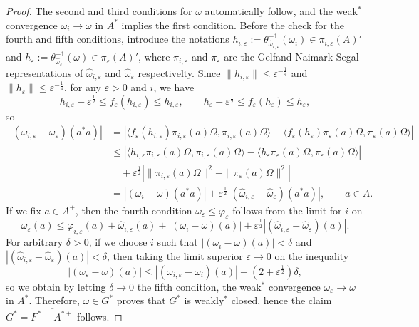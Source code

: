 \documentclass[a4paper]{amsart}
\newcommand{\e}{\varepsilon}
\theoremstyle{plain}
\theoremstyle{definition}
\begin{document}
\begin{proof}
The second and third conditions for $\omega$ automatically follow, and the weak$^*$ convergence $\omega_i\to\omega$ in $A^*$ implies the first condition.
Before the check for the fourth and fifth conditions, introduce the notations $h_{i,\e}:=\theta_{\widehat\omega_{i,\e}}^{-1}(\omega_i)\in\pi_{i,\e}(A)'$ and $h_\e:=\theta_{\widehat\omega_\e}^{-1}(\omega)\in\pi_\e(A)'$, where $\pi_{i,\e}$ and $\pi_\e$ are the Gelfand-Naimark-Segal representations of $\widehat\omega_{i,\e}$ and $\widehat\omega_\e$ respectivelty.
Since $\|h_{i,\e}\|\le\e^{-\frac14}$ and $\|h_\e\|\le\e^{-\frac14}$, for any $\e>0$ and $i$, we have
\[h_{i,\e}-\e^{\frac12}\le f_\e(h_{i,\e})\le h_{i,\e},\qquad h_\e-\e^{\frac12}\le f_\e(h_\e)\le h_\e,\]
so
\begin{align*}
|(\omega_{i,\e}-\omega_\e)(a^*a)|
&=|\langle f_\e(h_{i,\e})\pi_{i,\e}(a)\Omega,\pi_{i,\e}(a)\Omega\rangle-\langle f_\e(h_\e)\pi_\e(a)\Omega,\pi_\e(a)\Omega\rangle|\\
&\le|\langle h_{i,\e}\pi_{i,\e}(a)\Omega,\pi_{i,\e}(a)\Omega\rangle-\langle h_\e\pi_\e(a)\Omega,\pi_\e(a)\Omega\rangle|\\
&\quad+\e^{\frac12}|\|\pi_{i,\e}(a)\Omega\|^2-\|\pi_\e(a)\Omega\|^2|\\
&=|(\omega_i-\omega)(a^*a)|+\e^\frac12|(\widehat\omega_{i,\e}-\widehat\omega_\e)(a^*a)|,\qquad a\in A.
\end{align*}
If we fix $a\in A^+$, then the fourth condition $\omega_\e\le\varphi_\e$ follows from the limit for $i$ on
\[\omega_\e(a)\le\varphi_{i,\e}(a)+\widehat\omega_{i,\e}(a)+|(\omega_i-\omega)(a)|+\e^\frac12|(\widehat\omega_{i,\e}-\widehat\omega_\e)(a)|.\]
For arbitrary $\delta>0$, if we choose $i$ such that $|(\omega_i-\omega)(a)|<\delta$ and $|(\widehat\omega_{i,\e}-\widehat\omega_\e)(a)|<\delta$, then taking the limit superior $\e\to0$ on the inequality
\[|(\omega_\e-\omega)(a)|\le|(\omega_{i,\e}-\omega_i)(a)|+(2+\e^{\frac12})\delta,\]
so we obtain by letting $\delta\to0$ the fifth condition, the weak$^*$ convergence $\omega_\e\to\omega$ in $A^*$.
Therefore, $\omega\in G^*$ proves that $G^*$ is weakly$^*$ closed, hence the claim $G^*=\overline{F^*-A^{*+}}$ follows.
\end{proof}
\end{document}
